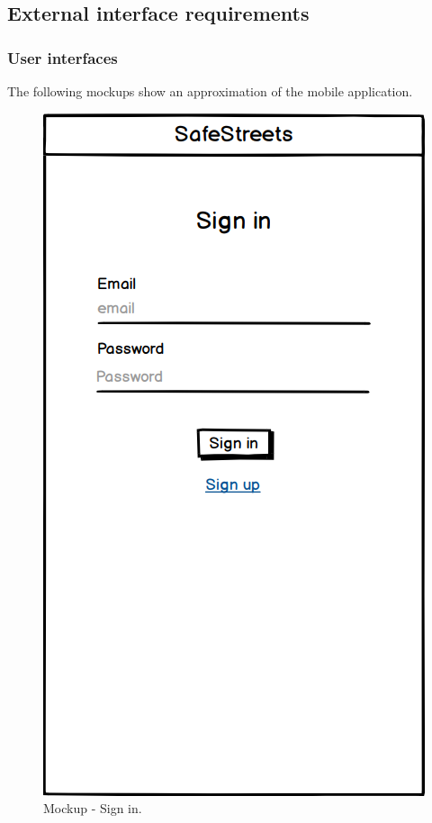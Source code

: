 \subsection{External interface requirements}
\subsubsection{User interfaces}
The following mockups show an approximation of the mobile application.

\setlength{\intextsep}{0pt plus \textheight minus 10pt}

\begin{figure}[H]
\centering
\begin{minipage}{.4\textwidth}
    \centering
    \includegraphics[width=.8\textwidth]{Images/sign-in.png}
    \caption{\label{fig:mockup-sign-in}Mockup - Sign in.}
\end{minipage}

\end{figure}
